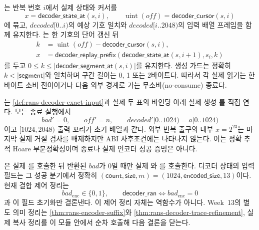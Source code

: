 \begin{definition}
\label{def:rans-decoder-trace-invariants}
는 반복 번호 \(i\)에서 실제 상태와 커서를
\[
  x=\mathsf{decoder\_state\_at}(s,i),\qquad
  \operatorname{uint}(off)=\mathsf{decoder\_cursor}(s,i)
\]
에 묶고, \(decoded[0..i)\)의 예상 기호 일치와
\(decoded[i..2048)\)의 입력 배열 프레임을 함께 유지한다.
는 한 기호의 단어 갱신 뒤
\[
\begin{aligned}
  k&=\operatorname{uint}(off)-\mathsf{decoder\_cursor}(s,i),\\
  x&=\mathsf{decoder\_replay\_prefix}
       (\mathsf{decoder\_state\_at}(s,i+1),s_i,k)
\end{aligned}
\]
를 두고 \(0\le k\le|\mathsf{decoder\_segment\_at}(s,i)|\)를 유지한다. 생성
가드는 정확히 \(k<|\mathsf{segment}|\)와 일치하며 구간 길이는 0, 1 또는
2바이트다. 따라서 각 실제 읽기는 한 바이트 소비 전이이거나 다음 외부 경계로
가는 무소비(no-consume) 종료다.
\end{definition}

\begin{verified}[실제 디코더의 정확 추적 복원]
\label{thm:rans-decoder-trace-refinement}
는
\cref{def:rans-decoder-exact-input}과 실제 두 표의 바인딩 아래 실제 생성
를 직접 연다. 모든 종료 실행에서
\[
  bad'=0,\qquad off'=n,\qquad
  decoded'[0..1024)=a[0..1024)
\]
이고 \([1024,2048)\) 출력 꼬리가 초기 배열과 같다. 외부 반복 출구의 내부
\(x=2^{23}\)는 마지막 실제 거절 검사를 배제하지만 ABI 사후조건에는 나타나지
않는다. 이는 정확 추적 Hoare 부분정확성이며 종료나 실제 인코더 성공 증명은
아니다.
\end{verified}

\begin{definition}
\label{def:rans-actual-harness}
은 실제
를 호출한 뒤 반환된 \(bad\)가 0일 때만 실제
와 를 호출한다.
디코더 상태의 입력 필드는 그 성공 분기에서 정확히
\((\mathsf{count},\mathsf{size},m)=(1024,\mathsf{encoded\_size},13)\)이다.
현재 결합 제어 정리는
\[
  bad_{\mathrm{enc}}\in\{0,1\},\qquad
  \mathsf{decoder\_ran}\Longleftrightarrow bad_{\mathrm{enc}}=0
\]
과 이 필드 초기화만 결론낸다. 이 제어 정리 자체는 역함수가 아니다. Week~13의
별도 의미 정리는 \cref{thm:rans-encoder-suffix}와
\cref{thm:rans-decoder-trace-refinement}, 실제 복사 정리를 이 모듈 안에서
순차 호출해 다음 결론을 닫는다.
\end{definition}

